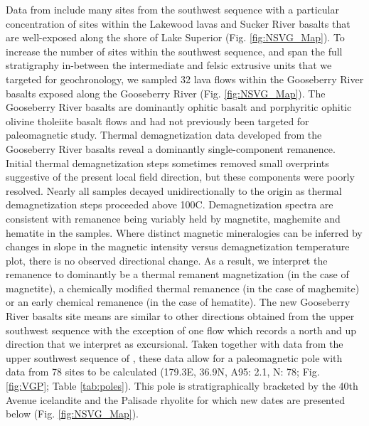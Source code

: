 \documentclass[11pt,letterpaper]{article}
\begin{document}
Data from \cite{Tauxe2009a} include many sites from the southwest sequence with a particular concentration of sites within the Lakewood lavas and Sucker River basalts that are well-exposed along the shore of Lake Superior (Fig. \ref{fig:NSVG_Map}). To increase the number of sites within the southwest sequence, and span the full stratigraphy in-between the intermediate and felsic extrusive units that we targeted for geochronology, we sampled 32 lava flows within the Gooseberry River basalts exposed along the Gooseberry River (Fig. \ref{fig:NSVG_Map}). The Gooseberry River basalts are dominantly ophitic basalt and porphyritic ophitic olivine tholeiite basalt flows \citep{Boerboom2004a} and had not previously been targeted for paleomagnetic study. Thermal demagnetization data developed from the Gooseberry River basalts reveal a dominantly single-component remanence. Initial thermal demagnetization steps sometimes removed small overprints suggestive of the present local field direction, but these components were poorly resolved. Nearly all samples decayed unidirectionally to the origin as thermal demagnetization steps proceeded above 100\textdegree C. Demagnetization spectra are consistent with remanence being variably held by magnetite, maghemite and hematite in the samples. Where distinct magnetic mineralogies can be inferred by changes in slope in the magnetic intensity versus demagnetization temperature plot, there is no observed directional change. As a result, we interpret the remanence to dominantly be a thermal remanent magnetization (in the case of magnetite), a chemically modified thermal remanence (in the case of maghemite) or an early chemical remanence (in the case of hematite). The new Gooseberry River basalts site means are similar to other directions obtained from the upper southwest sequence with the exception of one flow which records a north and up direction that we interpret as excursional. Taken together with data from the upper southwest sequence of \cite{Tauxe2009a}, these data allow for a paleomagnetic pole with data from 78 sites to be calculated (179.3\textdegree E, 36.9\textdegree N, A95: 2.1\textdegree, N: 78; Fig. \ref{fig:VGP}; Table \ref{tab:poles}). This pole is stratigraphically bracketed by the 40th Avenue icelandite and the Palisade rhyolite for which new dates are presented below (Fig. \ref{fig:NSVG_Map}).
\end{document}
